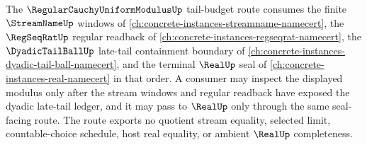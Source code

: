 The $\RegularCauchyUniformModulusUp$ tail-budget route consumes the finite $\StreamNameUp$ windows of \autoref{ch:concrete-instances-streamname-namecert}, the $\RegSeqRatUp$ regular readback of \autoref{ch:concrete-instances-regseqrat-namecert}, the $\DyadicTailBallUp$ late-tail containment boundary of \autoref{ch:concrete-instances-dyadic-tail-ball-namecert}, and the terminal $\RealUp$ seal of \autoref{ch:concrete-instances-real-namecert} in that order. A consumer may inspect the displayed modulus only after the stream windows and regular readback have exposed the dyadic late-tail ledger, and it may pass to $\RealUp$ only through the same seal-facing route. The route exports no quotient stream equality, selected limit, countable-choice schedule, host real equality, or ambient $\RealUp$ completeness.
